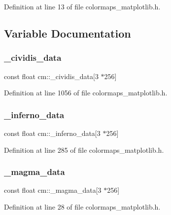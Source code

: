 Definition at line 13 of file colormaps\+\_\+matplotlib.\+h.



\subsection{Variable Documentation}
\mbox{\label{namespacecm_a9aebd281c6d694ef79eb8f989866ff6d}} 
\subsubsection{\texorpdfstring{\+\_\+cividis\+\_\+data}{\_cividis\_data}}
{\footnotesize\ttfamily const float cm\+::\+\_\+cividis\+\_\+data\mbox{[}3 $\ast$256\mbox{]}}



Definition at line 1056 of file colormaps\+\_\+matplotlib.\+h.

\mbox{\label{namespacecm_abd85098a9455ec3b6a1367e717904d81}} 
\subsubsection{\texorpdfstring{\+\_\+inferno\+\_\+data}{\_inferno\_data}}
{\footnotesize\ttfamily const float cm\+::\+\_\+inferno\+\_\+data\mbox{[}3 $\ast$256\mbox{]}}



Definition at line 285 of file colormaps\+\_\+matplotlib.\+h.

\mbox{\label{namespacecm_a6c7ebc740c952f5ae2569bbc4d6b0ba3}} 
\subsubsection{\texorpdfstring{\+\_\+magma\+\_\+data}{\_magma\_data}}
{\footnotesize\ttfamily const float cm\+::\+\_\+magma\+\_\+data\mbox{[}3 $\ast$256\mbox{]}}



Definition at line 28 of file colormaps\+\_\+matplotlib.\+h.

